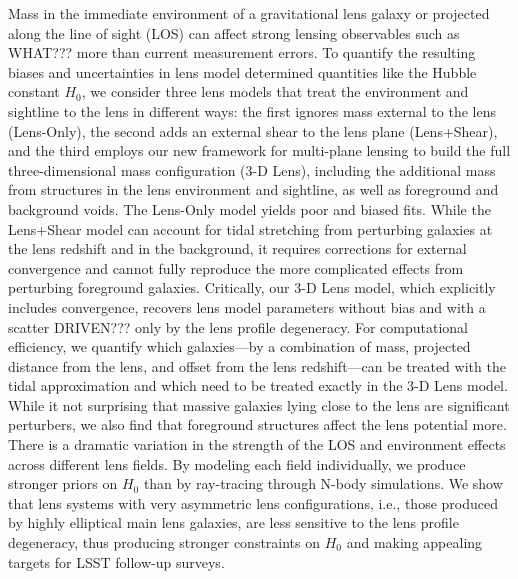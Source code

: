 Mass in the immediate environment of a gravitational lens galaxy or projected along the line of sight (LOS) can affect strong lensing observables such as WHAT??? more than current measurement errors. To quantify the resulting biases and uncertainties in lens model determined quantities like the Hubble constant $H_0$, we consider three lens models that treat the environment and sightline to the lens in different ways: the first ignores mass external to the lens (Lens-Only), the second adds an external shear to the lens plane (Lens+Shear), and the third employs our new 
framework for multi-plane lensing \citep{McCully14} to build the full three-dimensional mass configuration (3-D Lens), including the additional mass from structures in the lens environment and sightline, as well as foreground and background voids.  The Lens-Only model yields poor and biased fits.  While the Lens+Shear model can 
account for tidal stretching from perturbing galaxies at the lens redshift and in the background, it requires corrections for external convergence and cannot fully reproduce the more 
complicated effects from perturbing foreground galaxies.  Critically, our 3-D Lens model, which explicitly includes convergence, recovers lens model parameters without bias and with a scatter DRIVEN??? only by the lens profile degeneracy.  For computational efficiency, we quantify which galaxies---by a combination of mass, projected distance from the lens, and offset from the lens redshift---can be treated with the tidal approximation and which need to be treated exactly in the 3-D Lens model.  While it not surprising that massive galaxies lying close to the lens are significant perturbers, we also find that foreground structures affect the lens potential more.
There is a dramatic variation in the strength of the LOS and environment effects across different lens fields.  By modeling each field 
individually, we produce stronger priors on $H_0$ than by ray-tracing through N-body simulations.  We show that lens systems with very asymmetric lens configurations, i.e., those produced by highly elliptical main lens galaxies, are less sensitive to the lens profile degeneracy, thus producing stronger constraints on $H_0$ and making appealing targets for LSST follow-up surveys.
  
  
  